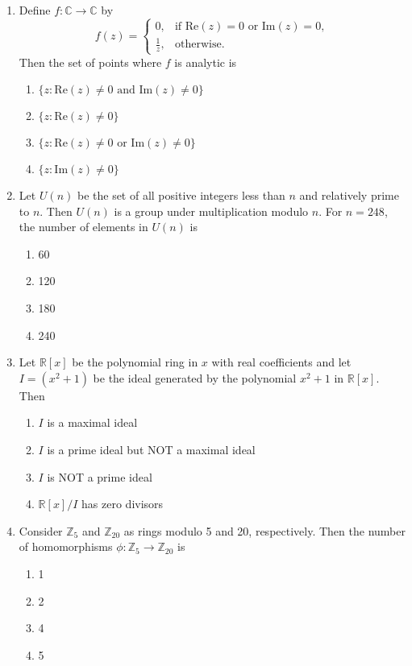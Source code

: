 \documentclass[journal]{IEEEtran}
\numberwithin{figure}{enumi}
\begin{document}
\begin{enumerate}
\item Define $f: \mathbb{C} \to \mathbb{C}$ by
\begin{equation*}
f(z) =
\begin{cases}
0, & \text{if } \text{Re}(z) = 0 \text{ or Im}(z) = 0, \\
\frac{1}{z}, & \text{otherwise}.
\end{cases}
\end{equation*}
Then the set of points where $f$ is analytic is
\begin{enumerate}
    \item $\{z : \text{Re}(z) \neq 0 \text{ and } \text{Im}(z) \neq 0\}$
    \item $\{z : \text{Re}(z) \neq 0\}$
    \item $\{z : \text{Re}(z) \neq 0 \text{ or } \text{Im}(z) \neq 0\}$
    \item $\{z : \text{Im}(z) \neq 0\}$
\end{enumerate}
\item Let $U(n)$ be the set of all positive integers less than $n$ and relatively prime to $n$. Then $U(n)$ is a group under multiplication modulo $n$. For $n = 248$, the number of elements in $U(n)$ is
\begin{enumerate}
    \item 60
    \item 120
    \item 180
    \item 240
\end{enumerate}

\item Let $\mathbb{R}[x]$ be the polynomial ring in $x$ with real coefficients and let $I = (x^2 + 1)$ be the ideal generated by the polynomial $x^2 + 1$ in $\mathbb{R}[x]$. Then
\begin{enumerate}
    \item $I$ is a maximal ideal
    \item $I$ is a prime ideal but NOT a maximal ideal
    \item $I$ is NOT a prime ideal
    \item $\mathbb{R}[x]/I$ has zero divisors
\end{enumerate}

\item Consider $\mathbb{Z}_5$ and $\mathbb{Z}_{20}$ as rings modulo 5 and 20, respectively. Then the number of homomorphisms $\phi: \mathbb{Z}_5 \to \mathbb{Z}_{20}$ is
\begin{enumerate}
    \item 1
    \item 2
    \item 4
    \item 5
\end{enumerate}


\end{enumerate}
\end{document}
